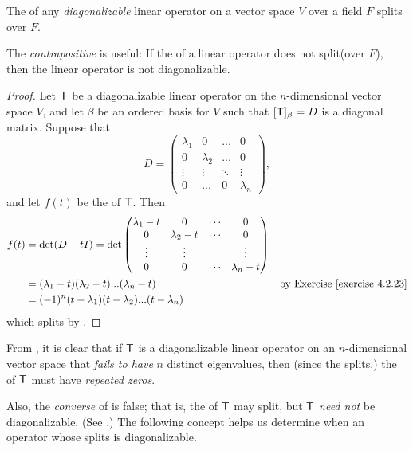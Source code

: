 \begin{theorem} \label{thm 5.6}
The \CPOLY{} of any \emph{diagonalizable} linear operator on a vector space \(V\) over a field \(F\) splits over \(F\).
\end{theorem}

\begin{note}
The \emph{contrapositive} is useful: If the \CPOLY{} of a linear operator does not split(over \(F\)), then the linear operator is not diagonalizable.
\end{note}

\begin{proof}
Let \(\textsf{T}\) be a diagonalizable linear operator on the \(n\)-dimensional vector space \(V\), and let \(\beta\) be an ordered basis for \(V\) such that \([\textsf{T}]_{\beta} = D\) is a diagonal matrix.
Suppose that
\[
    D = \begin{pmatrix}
        \lambda_1 & 0         & ...    & 0 \\
        0         & \lambda_2 & ...    & 0 \\
        \vdots    & \vdots    & \ddots & \vdots \\
        0         & ...       & 0      & \lambda_n
    \end{pmatrix},
\]
and let \(f(t)\) be the \CPOLY{} of \(\textsf{T}\).
Then
\begin{align*}
    f(t) & = \det(D - tI) = \det \begin{pmatrix}
                \lambda_{1}-t & 0 & \cdots & 0 \\
                0 & \lambda_{2}-t & \cdots & 0 \\
                \vdots & \vdots & & \vdots \\
                0 & 0 & \cdots & \lambda_{n}-t
            \end{pmatrix} \\
         & = (\lambda_1 - t)(\lambda_2 - t) ... (\lambda_n - t) & \text{by \EXEC{4.2.23}} \\
         & = (-1)^n (t - \lambda_1)(t - \lambda_2) ... (t - \lambda_n)
\end{align*}
which splits by .
\end{proof}

\begin{remark} \label{remark 5.2.3}
From , it is clear that if \(\textsf{T}\) is a diagonalizable linear operator on an \(n\)-dimensional vector space that \emph{fails to have} \(n\) distinct eigenvalues, then (since the \CPOLY{} splits,) the \CPOLY{} of \(\textsf{T}\) must have \emph{repeated zeros}.

Also, the \emph{converse} of  is false;
that is, the \CPOLY{} of \(\textsf{T}\) may split, but \(\textsf{T}\) \emph{need not} be diagonalizable.
(See .)
The following concept helps us determine when an operator whose \CPOLY{} splits is diagonalizable.
\end{remark}

